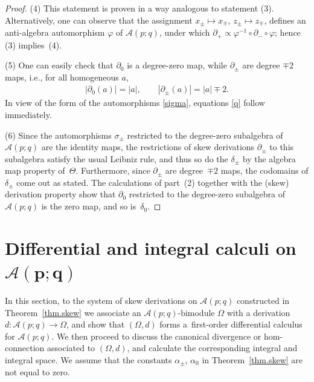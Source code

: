 \documentclass[pdftex]{sigma}
\numberwithin{equation}{section}
\def\AWeyl#1#2{{\mathcal{A}}(#1;#2)}
\begin{document}
\begin{proof}
(4) This statement is proven in a way analogous to statement (3). Alternatively, one can observe that the assignment $x_\pm \mapsto x_\mp$, $z_\pm\mapsto z_\mp$, def\/ines an anti-algebra automorphism $\varphi$ of ${\mathcal{A}}(p;q)$, under which $\partial_+ \propto \varphi^{-1}\circ \partial_-\circ \varphi$; hence (3) implies~(4).

(5) One can easily check that $\partial_0$ is a degree-zero map, while $\partial_\pm$ are degree $\mp 2$ maps, i.e., for all homogeneous $a$,
\begin{gather*}
|\partial_0(a)| = |a|, \qquad |\partial_\pm(a)| = |a|\mp 2.
\end{gather*}
In view of the form of the automorphisms \eqref{sigma}, equations \eqref{q} follow immediately.

(6) Since the automorphisms $\sigma_\pm$ restricted to the degree-zero subalgebra of $\AWeyl p q$ are the identity maps, the restrictions of skew derivations $\partial_\pm$ to this subalgebra satisfy the usual Leibniz rule, and thus so do the $\delta_\pm$ by the algebra map property of~$\Theta$. Furthermore, since $\partial_\pm$ are degree~$\mp 2$ maps, the codomains of $\delta_\pm$ come out as stated. The calculations of part~(2) together with the (skew) derivation property show that $\partial_0$ restricted to the degree-zero subalgebra of~$\AWeyl p q$ is the zero map, and so is~$\delta_0$.
\end{proof}

\section[Dif\/ferential and integral calculi on ${\mathcal A}(p;q)$]{Dif\/ferential and integral calculi on $\boldsymbol{\AWeyl p q}$}\label{sec.diff.a}
In this section, to the system of skew derivations on $\AWeyl p q$ constructed in Theorem~\ref{thm.skew} we associate an $\AWeyl p q$-bimodule $\Omega$ with a derivation $d\colon \AWeyl p q \to \Omega$, and show that $(\Omega, d)$ forms a~f\/irst-order dif\/ferential calculus for $\AWeyl p q$. We then proceed to discuss the canonical divergence or hom-connection associated to $(\Omega, d)$, and calculate the corresponding integral and integral space. We assume that the constants $\alpha_\pm$, $\alpha_0$ in Theorem~\ref{thm.skew} are not equal to zero.
\end{document}
